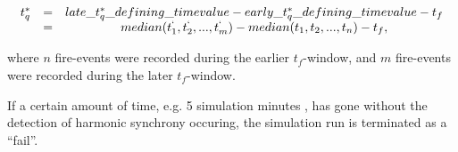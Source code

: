 	\begin{equation}
	\label{t_q_definition}
	\begin{array}{rrclcl}
	t_q^* & = & late\_t_q^*\_defining\_timevalue - early\_t_q^*\_defining\_timevalue - t_f \\
	& = & median(t_1^`, t_2^`, ..., t_m^`) - median(t_1, t_2, ..., t_n) - t_f , \\
	\end{array}
	\end{equation}

	where $n$ fire-events were recorded during the earlier $t_f$-window, and $m$ fire-events were recorded during the later $t_f$-window.
	
	If a certain amount of time, e.g. 5 simulation minutes \cite{nymoen_synch}, has gone without the detection of harmonic synchrony occuring, the simulation run is terminated as a ``fail''.


